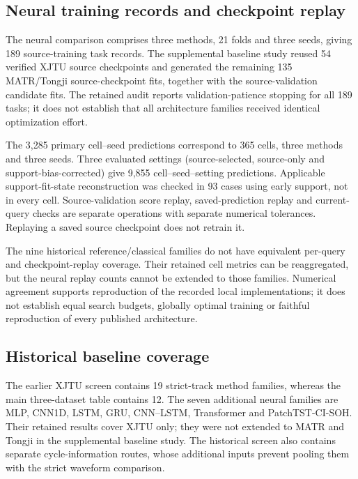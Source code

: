 \documentclass[11pt,a4paper]{article}
\begin{document}
\subsection{Neural training records and checkpoint replay}
The neural comparison comprises three methods, 21 folds and three seeds, giving 189 source-training task records. The supplemental baseline study reused 54 verified XJTU source checkpoints and generated the remaining 135 MATR/Tongji source-checkpoint fits, together with the source-validation candidate fits. The retained audit reports validation-patience stopping for all 189 tasks; it does not establish that all architecture families received identical optimization effort.



The 3,285 primary cell--seed predictions correspond to 365 cells, three methods and three seeds. Three evaluated settings (source-selected, source-only and support-bias-corrected) give 9,855 cell--seed--setting predictions. Applicable support-fit-state reconstruction was checked in 93 cases using early support, not in every cell. Source-validation score replay, saved-prediction replay and current-query checks are separate operations with separate numerical tolerances. Replaying a saved source checkpoint does not retrain it.

The nine historical reference/classical families do not have equivalent per-query and checkpoint-replay coverage. Their retained cell metrics can be reaggregated, but the neural replay counts cannot be extended to those families. Numerical agreement supports reproduction of the recorded local implementations; it does not establish equal search budgets, globally optimal training or faithful reproduction of every published architecture.

\subsection{Historical baseline coverage}
The earlier XJTU screen contains 19 strict-track method families, whereas the main three-dataset table contains 12. The seven additional neural families are MLP, CNN1D, LSTM, GRU, CNN--LSTM, Transformer and PatchTST-CI-SOH. Their retained results cover XJTU only; they were not extended to MATR and Tongji in the supplemental baseline study. The historical screen also contains separate cycle-information routes, whose additional inputs prevent pooling them with the strict waveform comparison.
\end{document}
